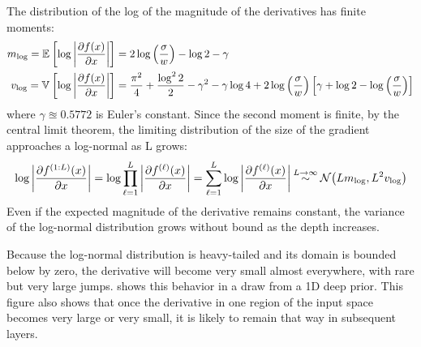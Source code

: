 The distribution of the log of the magnitude of the derivatives has finite moments:
%
\begin{align}
m_{\log} = \mathbb{E}_{} \left[ {\log \left| \frac{\partial f(x)}{\partial x} \right|} \right] & = 2 \log \left( \frac{\sigma}{w} \right) - \log2 - \gamma \nonumber \\
v_{\log} = \mathbb{V}_{} \left[ {\log \left| \frac{\partial f(x)}{\partial x} \right|} \right] & = \frac{\pi^2}{4} + \frac{\log^2 2}{2}  - \gamma^2 - \gamma \log4 + 2 \log\left(\frac{\sigma}{w}\right) \left[ \gamma + \log2 - \log \left(\frac{\sigma}{w}\right) \right]
\end{align}
%
where $\gamma \approxeq 0.5772$ is Euler's constant.  Since the second moment is finite, by the central limit theorem, the limiting distribution of the size of the gradient approaches a log-normal as L grows:
%
\begin{align}
\log \left| \frac{\partial f^{(1:L)}(x)}{\partial x} \right| 
 = \log \prod_{\ell=1}^L \left| \frac{\partial f^{(\ell)}(x)}{\partial x} \right| 
 = \sum_{\ell=1}^L \log \left| \frac{\partial f^{(\ell)}(x)}{\partial x} \right| 
\mathbin{\overset{L \rightarrow \infty}{\sim}} \mathcal{N}\!\left( L m_{\log} ,L^2 v_{\log}\right)
\end{align}
%
Even if the expected magnitude of the derivative remains constant, the variance of the log-normal distribution grows without bound as the depth increases.

Because the log-normal distribution is heavy-tailed and its domain is bounded below by zero, the derivative will become very small almost everywhere, with rare but very large jumps.  
 shows this behavior in a draw from a 1D deep \gp{} prior.
This figure also shows that once the derivative in one region of the input space becomes very large or very small, it is likely to remain that way in subsequent layers.
%







